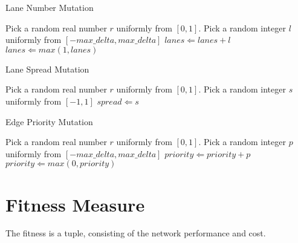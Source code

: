 \documentclass[11pt, oneside, notitlepage, draft]{article}
\begin{document}
            \begin{algorithm}
            \caption{Lane Number Mutation}
            \label{mut:nolanes}
            \begin{algorithmic}
            \STATE Pick a random real number $r$ uniformly from $[0, 1]$.
            \STATE Pick a random integer $l$ uniformly from $[-max\_delta, max\_delta]$
            \STATE $lanes \Leftarrow lanes + l$
            \STATE $lanes \Leftarrow max(1, lanes)$
            \ENDIF
            \end{algorithmic}
            \end{algorithm}

            \begin{algorithm}
            \caption{Lane Spread Mutation}
            \label{mut:spread}
            \begin{algorithmic}
            \STATE Pick a random real number $r$ uniformly from $[0, 1]$.
            \STATE Pick a random integer $s$ uniformly from $[-1, 1]$
            \STATE $spread \Leftarrow s$
            \ENDIF
            \end{algorithmic}
            \end{algorithm}


            \begin{algorithm}
            \caption{Edge Priority Mutation}
            \label{mut:prior}
            \begin{algorithmic}
            \STATE Pick a random real number $r$ uniformly from $[0, 1]$.
            \STATE Pick a random integer $p$ uniformly from $[-max\_delta, max\_delta]$
            \STATE $priority \Leftarrow priority + p$
            \STATE $priority \Leftarrow max(0, priority)$
            \ENDIF
            \end{algorithmic}
            \end{algorithm}



    \section{Fitness Measure}
        The fitness is a tuple, consisting of the network performance and cost. 
\end{document}
